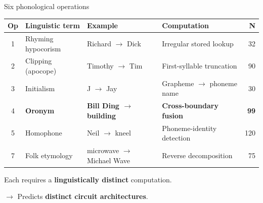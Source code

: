 \documentclass[10pt,aspectratio=169]{beamer}
\begin{document}
\begin{frame}{Six phonological operations}
\hypertarget{sl:operations}{}

\begin{center}
\small
\begin{tabular}{clllr}
\toprule
\textbf{Op} & \textbf{Linguistic term} & \textbf{Example} & \textbf{Computation} & \textbf{N} \\
\midrule
1 & Rhyming hypocorism & Richard $\to$ Dick & Irregular stored lookup & 32 \\
2 & Clipping (apocope) & Timothy $\to$ Tim & First-syllable truncation & 90 \\
3 & Initialism & J $\to$ Jay & Grapheme $\to$ phoneme name & 30 \\
4 & \textbf{Oronym} & \textbf{Bill Ding $\to$ building} & \textbf{Cross-boundary fusion} & \textbf{99} \\
5 & Homophone & Neil $\to$ kneel & Phoneme-identity detection & 120 \\
7 & Folk etymology & microwave $\to$ Michael Wave & Reverse decomposition & 75 \\
\bottomrule
\end{tabular}
\end{center}

\vspace{0.5em}
Each requires a \textbf{linguistically distinct} computation.

$\to$ Predicts \textbf{distinct circuit architectures}.
\end{frame}
\end{document}
